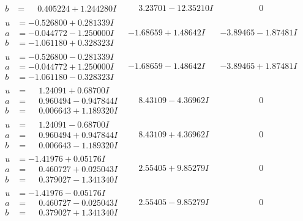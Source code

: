 \documentclass[1p]{elsarticle_modified}
\theoremstyle{definition}
\begin{document}
$$\begin{array}{c|c|c}
\begin{aligned}
b &= \phantom{-}0.405224 + 1.244280 I\end{aligned}
 & \phantom{-}3.23701 - 12.35210 I & \phantom{-0.000000 } 0 \\ \hline\begin{aligned}
u &= -0.526800 + 0.281339 I \\
a &= -0.044772 - 1.250000 I \\
b &= -1.061180 + 0.328323 I\end{aligned}
 & -1.68659 + 1.48642 I & -3.89465 - 1.87481 I \\ \hline\begin{aligned}
u &= -0.526800 - 0.281339 I \\
a &= -0.044772 + 1.250000 I \\
b &= -1.061180 - 0.328323 I\end{aligned}
 & -1.68659 - 1.48642 I & -3.89465 + 1.87481 I \\ \hline\begin{aligned}
u &= \phantom{-}1.24091 + 0.68700 I \\
a &= \phantom{-}0.960494 - 0.947844 I \\
b &= \phantom{-}0.006643 + 1.189320 I\end{aligned}
 & \phantom{-}8.43109 - 4.36962 I & \phantom{-0.000000 } 0 \\ \hline\begin{aligned}
u &= \phantom{-}1.24091 - 0.68700 I \\
a &= \phantom{-}0.960494 + 0.947844 I \\
b &= \phantom{-}0.006643 - 1.189320 I\end{aligned}
 & \phantom{-}8.43109 + 4.36962 I & \phantom{-0.000000 } 0 \\ \hline\begin{aligned}
u &= -1.41976 + 0.05176 I \\
a &= \phantom{-}0.460727 + 0.025043 I \\
b &= \phantom{-}0.379027 - 1.341340 I\end{aligned}
 & \phantom{-}2.55405 + 9.85279 I & \phantom{-0.000000 } 0 \\ \hline\begin{aligned}
u &= -1.41976 - 0.05176 I \\
a &= \phantom{-}0.460727 - 0.025043 I \\
b &= \phantom{-}0.379027 + 1.341340 I\end{aligned}
 & \phantom{-}2.55405 - 9.85279 I & \phantom{-0.000000 } 0 \\ \hline\begin{aligned}

\end{aligned}
\end{array}$$
\end{document}
